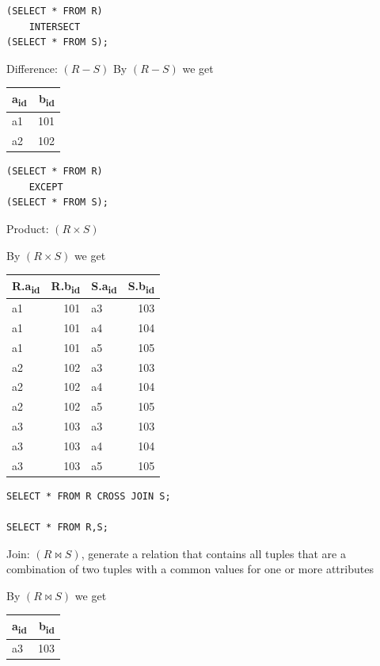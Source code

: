 \documentclass[11pt]{article}
\begin{document}
\begin{verbatim}
(SELECT * FROM R)
    INTERSECT
(SELECT * FROM S);
\end{verbatim}

Difference: \((R-S)\)
By \((R-S)\) we get
\begin{center}
\begin{tabular}{lr}
a\textsubscript{id} & b\textsubscript{id}\\
\hline
a1 & 101\\
a2 & 102\\
\end{tabular}
\end{center}

\begin{verbatim}
(SELECT * FROM R)
    EXCEPT
(SELECT * FROM S);
\end{verbatim}

Product: \((R\times S)\)

By \((R\times S)\) we get
\begin{center}
\begin{tabular}{lrlr}
R.a\textsubscript{id} & R.b\textsubscript{id} & S.a\textsubscript{id} & S.b\textsubscript{id}\\
\hline
a1 & 101 & a3 & 103\\
a1 & 101 & a4 & 104\\
a1 & 101 & a5 & 105\\
a2 & 102 & a3 & 103\\
a2 & 102 & a4 & 104\\
a2 & 102 & a5 & 105\\
a3 & 103 & a3 & 103\\
a3 & 103 & a4 & 104\\
a3 & 103 & a5 & 105\\
\end{tabular}
\end{center}

\begin{verbatim}
SELECT * FROM R CROSS JOIN S;

SELECT * FROM R,S;
\end{verbatim}

Join: \((R\bowtie S)\), generate a relation that contains all tuples that are a combination of two
tuples with a common values for one or more attributes

By \((R\bowtie S)\) we get
\begin{center}
\begin{tabular}{lr}
a\textsubscript{id} & b\textsubscript{id}\\
\hline
a3 & 103\\
\end{tabular}
\end{center}
\end{document}
